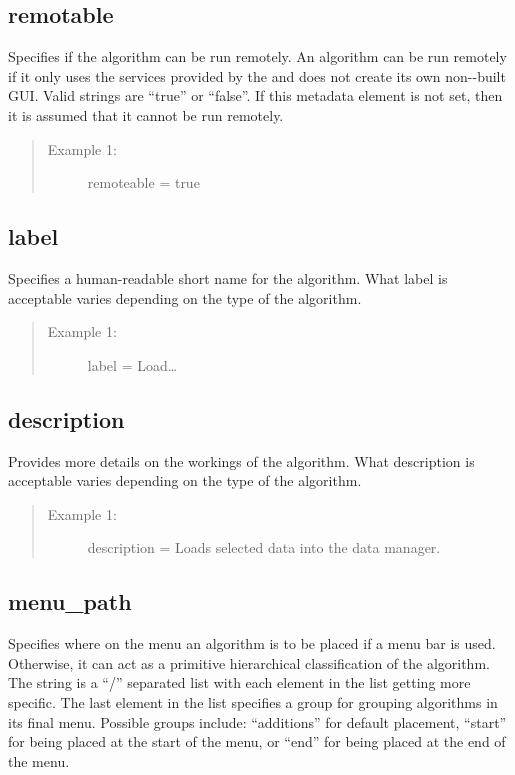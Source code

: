\subsection*{remotable}
Specifies if the algorithm can be run remotely. An algorithm can be run
remotely if it only uses the services provided by the 
and does not create its own non--built GUI. Valid
strings are ``true'' or ``false''. If this metadata element is not set, then
it is assumed that it cannot be run remotely.

\begin{quote}
\begin{description}
  \item[Example 1:] remoteable = true 
\end{description}
\end{quote}


\subsection*{label}
Specifies a human-readable short name for the algorithm. What label is
acceptable varies depending on the type of the algorithm. 

\begin{quote}
\begin{description}
  \item[Example 1:] label = Load\ldots 
\end{description}
\end{quote}


\subsection*{description}
Provides more details on the workings of the algorithm. What
description is acceptable varies depending on the type of the algorithm.

\begin{quote}
\begin{description}
  \item[Example 1:] description = Loads selected data into the data manager. 
\end{description}
\end{quote}


\subsection*{menu\_path}
Specifies where on the menu an algorithm is to be
placed if a menu bar is used. Otherwise, it can act as a primitive hierarchical
classification of the algorithm. The string is a ``/'' separated list with
each element in the list getting more specific. The last element in the list
specifies a group for grouping algorithms in its final menu. Possible groups
include: ``additions'' for default placement, ``start'' for being placed at
the start of the menu, or ``end'' for being placed at the end of the menu.

